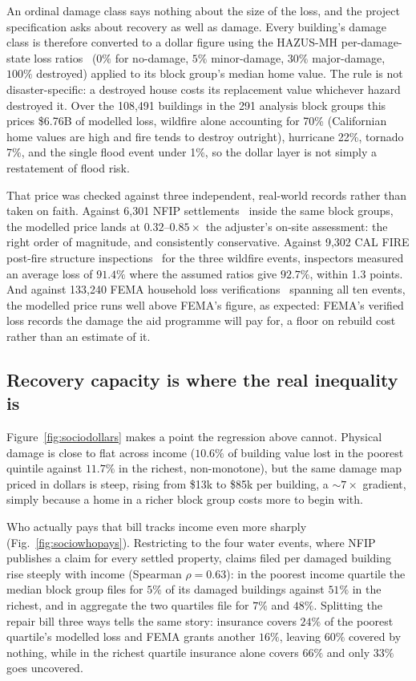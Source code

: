 \documentclass[10pt,twocolumn]{article}
\newcommand{\class}[1]{\textsf{#1}}
\begin{document}
An ordinal damage class says nothing about the size of the loss, and the project specification asks
about recovery as well as damage. Every building's damage class is therefore converted to a dollar
figure using the HAZUS-MH per-damage-state loss ratios~\cite{hazus} ($0\%$ for \class{no-damage},
$5\%$ \class{minor-damage}, $30\%$ \class{major-damage}, $100\%$ \class{destroyed}) applied to its
block group's median home value. The rule is not disaster-specific: a destroyed house costs its
replacement value whichever hazard destroyed it. Over the 108,491 buildings in the 291 analysis block
groups this prices \$6.76B of modelled loss, wildfire alone accounting for 70\% (Californian home
values are high and fire tends to destroy outright), hurricane 22\%, tornado 7\%, and the single
flood event under 1\%, so the dollar layer is not simply a restatement of flood risk.

That price was checked against three independent, real-world records rather than taken on faith.
Against 6,301 NFIP settlements~\cite{openfema} inside the same block groups, the modelled price lands
at $0.32$--$0.85\times$ the adjuster's on-site assessment: the right order of magnitude, and
consistently conservative. Against 9,302 CAL FIRE post-fire structure inspections~\cite{calfire} for
the three wildfire events, inspectors measured an average loss of $91.4\%$ where the assumed ratios
give $92.7\%$, within 1.3 points. And against 133,240 FEMA household loss verifications~\cite{openfema}
spanning all ten events, the modelled price runs well above FEMA's figure, as expected: FEMA's
verified loss records the damage the aid programme will pay for, a floor on rebuild cost rather than
an estimate of it.

\subsection{Recovery capacity is where the real inequality is}
\label{sec:socio-recovery}

Figure~\ref{fig:sociodollars} makes a point the regression above cannot. Physical damage is close to
flat across income ($10.6\%$ of building value lost in the poorest quintile against $11.7\%$ in the
richest, non-monotone), but the same damage map priced in dollars is steep, rising from \$13k to \$85k
per building, a $\sim\!7\times$ gradient, simply because a home in a richer block group costs more to
begin with.

Who actually pays that bill tracks income even more sharply (Fig.~\ref{fig:sociowhopays}). Restricting
to the four water events, where NFIP publishes a claim for every settled property, claims filed per
damaged building rise steeply with income (Spearman $\rho = 0.63$): in the poorest income quartile the
median block group files for $5\%$ of its damaged buildings against $51\%$ in the richest, and in
aggregate the two quartiles file for $7\%$ and $48\%$. Splitting the repair bill three ways
tells the same story: insurance covers $24\%$ of the poorest quartile's modelled loss and FEMA grants
another $16\%$, leaving $60\%$ covered by nothing, while in the richest quartile insurance alone
covers $66\%$ and only $33\%$ goes uncovered.
\end{document}
